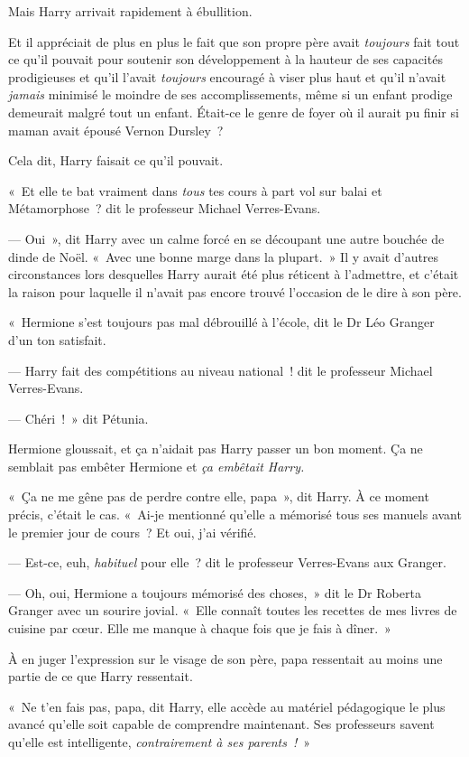 Mais Harry arrivait rapidement à ébullition.

Et il appréciait de plus en plus le fait que son propre père avait \emph{toujours} fait tout ce qu'il pouvait pour soutenir son développement à la hauteur de ses capacités prodigieuses et qu'il l'avait \emph{toujours} encouragé à viser plus haut et qu'il n'avait \emph{jamais} minimisé le moindre de ses accomplissements, même si un enfant prodige demeurait malgré tout un enfant. Était-ce le genre de foyer où il aurait pu finir si maman avait épousé Vernon Dursley~?

Cela dit, Harry faisait ce qu'il pouvait.

«~Et elle te bat vraiment dans \emph{tous} tes cours à part vol sur balai et Métamorphose~? dit le professeur Michael Verres-Evans.

--- Oui~», dit Harry avec un calme forcé en se découpant une autre bouchée de dinde de Noël. «~Avec une bonne marge dans la plupart.~» Il y avait d'autres circonstances lors desquelles Harry aurait été plus réticent à l'admettre, et c'était la raison pour laquelle il n'avait pas encore trouvé l'occasion de le dire à son père.

«~Hermione s'est toujours pas mal débrouillé à l'école, dit le Dr Léo Granger d'un ton satisfait.

--- Harry fait des compétitions au niveau national~! dit le professeur Michael Verres-Evans.

--- Chéri~!~» dit Pétunia.

Hermione gloussait, et ça n'aidait pas Harry passer un bon moment. Ça ne semblait pas embêter Hermione et \emph{ça embêtait Harry.}

«~Ça ne me gêne pas de perdre contre elle, papa~», dit Harry. À ce moment précis, c'était le cas. «~Ai-je mentionné qu'elle a mémorisé tous ses manuels avant le premier jour de cours~? Et oui, j'ai vérifié.

--- Est-ce, euh, \emph{habituel} pour elle~? dit le professeur Verres-Evans aux Granger.

--- Oh, oui, Hermione a toujours mémorisé des choses,~» dit le Dr Roberta Granger avec un sourire jovial. «~Elle connaît toutes les recettes de mes livres de cuisine par cœur. Elle me manque à chaque fois que je fais à dîner.~»

À en juger l'expression sur le visage de son père, papa ressentait au moins une partie de ce que Harry ressentait.

«~Ne t'en fais pas, papa, dit Harry, elle accède au matériel pédagogique le plus avancé qu'elle soit capable de comprendre maintenant. Ses professeurs savent qu'elle est intelligente, \emph{contrairement à ses parents~!}~»

